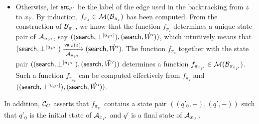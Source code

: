 \documentclass{llncs}
\newcommand{\zhilin}[1]{\color{cyan} {ZL: #1 :LZ} \color{black}}
\begin{document}
\begin{itemize}
%
\item Otherwise,  
 let $\mathsf{src}_{i''}$ be the label of the edge used in the backtracking from $z$ to $x_{i'}$. 
%
 By induction, $f_{\pi_z} \in \mathcal{M}(\mathcal{B}_{\pi_{z}})$ has been computed. From the construction of $\mathcal{B}_{\pi_{z}}$, we know that the function $f_{\pi_z}$ determines a unique state pair of $\mathcal{A}_{u_{i''}}$, say $((\mathsf{search}, \bot^{|u_{i''}|}), (\mathsf{search}, \vec{W}'))$, which intuitively means that $(\mathsf{search}, \bot^{|u_{i''}|}) \xrightarrow[\mathcal{A}_{u_{i''}}]{\mathsf{val}_{\vec{v}}(z)} (\mathsf{search}, \vec{W}')$. The function $f_{\pi_z}$ together with the state pair $((\mathsf{search}, \bot^{|u_{i''}|}), (\mathsf{search}, \vec{W}'))$ determines a function $f_{\pi_{x_{i'}}} \in \mathcal{M}(\mathcal{B}_{\pi_{x_{i'}}})$. Such a function $f_{\pi_{x_{i'}}} $ can be computed effectively from $f_{\pi_z}$ and $((\mathsf{search}, \bot^{|u_{i''}|}), (\mathsf{search}, \vec{W}'))$. 
\end{itemize}
In addition, $\mathcal{C}_C$ asserts that $f_{\pi_{x_{i'}}}$ contains a state pair $((q'_0, -), (q', -))$ such that $q'_0$ is the initial state of $\mathcal{A}_{x_{i'}}$ and $q'$ is a final state of $\mathcal{A}_{x_{i'}}$.

\end{document}
